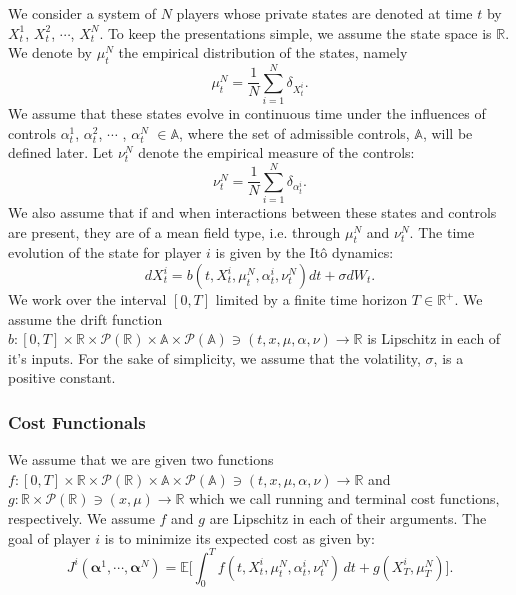\documentclass[11pt]{article}
\def\balpha{\boldsymbol{\alpha}}
\newcommand\cP{\mathcal P}
\newcommand\EE{\mathbb E}
\begin{document}
We consider a system of $N$ players whose private states are denoted at time $t$ by $X^1_t$, $X^2_t$, $\cdots$, $X^N_t$. To keep the presentations simple, we assume the state space is $\mathbb{R}$. We denote by $\mu^N_t$ the empirical distribution of the states, namely
\begin{equation*}
\mu^N_t=\frac1N\sum_{i=1}^N\delta_{X^i_t}.
\end{equation*}
We assume that these states evolve in continuous time under the influences of controls  $\alpha^1_t$, $\alpha^2_t$, $\cdots$ , $\alpha^N_t$ $\in \mathbb{A}$, where the set of admissible controls, $\mathbb{A}$, will be defined later. Let $\nu^N_{t}$ denote the empirical measure of the controls:
\begin{equation*}
\nu^N_t=\frac1N\sum_{i=1}^N\delta_{\alpha^i_t}.
\end{equation*}
We also assume that if and when interactions between these states and controls are present, they are of a mean field type, i.e. through $\mu^N_t$ and $\nu^N_t$. The time evolution of the state for player $i$ is given by the It\^{o} dynamics:
\begin{equation*}
    dX^i_t=b(t,X^i_t,\mu^N_t,\alpha^i_t,\nu^N_t)dt+\sigma dW_t.
\end{equation*}
We work over the interval $[0,T]$ limited by a finite time horizon $T \in \mathbb{R}^+$. We assume the drift function $b:[0,T] \times \mathbb{R} \times \cP(\mathbb{R}) \times \mathbb{A} \times \cP(\mathbb{A}) \ni (t,x,\mu,\alpha,\nu)  \rightarrow \mathbb{R}$ is Lipschitz in each of it's inputs. For the sake of simplicity, we assume that the volatility, $\sigma$, is a positive constant.

\subsubsection*{\textbf{Cost Functionals}}
We assume that we are given two functions $f:[0,T] \times \mathbb{R} \times \cP(\mathbb{R}) \times \mathbb{A} \times \cP(\mathbb{A}) \ni (t,x,\mu,\alpha, \nu) \rightarrow \mathbb{R}$ and $g:\mathbb{R}\times \cP(\mathbb{R}) \ni (x,\mu) \rightarrow \mathbb{R}$ which we call running and terminal cost functions, respectively. We assume $f$ and $g$ are Lipschitz in each of their arguments. The goal of player $i$ is to minimize its expected cost as given by:
\begin{equation*}
J^i(\balpha^1,\cdots,\balpha^N)=\EE\bigg[\int_0^Tf(t,X^i_t,\mu^N_{t},\alpha^i_t,\nu^N_{t})\,dt +g(X^i_T,\mu^{N}_{T})\bigg].
\end{equation*}
\end{document}
